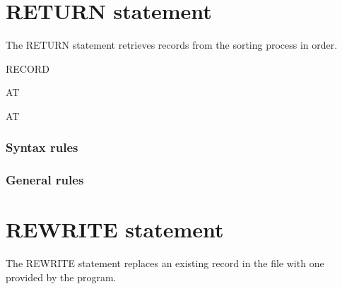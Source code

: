 \section{RETURN statement}

The RETURN statement retrieves records from the sorting process in order.

\begin{syntax}
   \filename RECORD
  \begin{0-1}
     \identifier
  \end{0-1}

  AT  \imperativestatement

  \begin{0-1}
     AT  \imperativestatement
  \end{0-1}

  \begin{0-1}
  \end{0-1}
\end{syntax}

\subsubsection{Syntax rules}

\subsubsection{General rules}

\section{REWRITE statement}

The REWRITE statement replaces an existing record in the file with one provided by the program.

